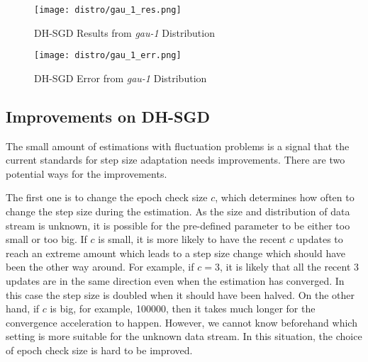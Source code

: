 \begin{figure}[H]
    \centering
	\texttt{[image: distro/gau\_1\_res.png]}
    \caption{DH-SGD Results from  \textit{gau-1} Distribution}
    \label{fig: DH_SGD_res}

\end{figure}

\begin{figure}[H]
    \centering
	\texttt{[image: distro/gau\_1\_err.png]}
    \caption{DH-SGD Error from \textit{gau-1} Distribution}
    \label{fig: DH_SGD_err}

\end{figure}

\subsection{Improvements on DH-SGD}

The small amount of estimations with fluctuation problems is a signal that the current standards for step size adaptation needs improvements. There are two potential ways for the improvements.

The first one is to change the epoch check size $c$, which determines how often to change the step size during the estimation. As the size and distribution of data stream is unknown, it is possible for the pre-defined parameter to be either too small or too big. If $c$ is small, it is more likely to have the recent $c$ updates to reach an extreme amount which leads to a step size change which should have been the other way around. For example, if $c = 3$, it is likely that all the recent $3$ updates are in the same direction even when the estimation has converged. In this case the step size is doubled when it should have been halved. On the other hand, if $c$ is big, for example, 100000, then it takes much longer for the convergence acceleration to happen. However, we cannot know beforehand which setting is more suitable for the unknown data stream. In this situation, the choice of epoch check size is hard to be improved.

